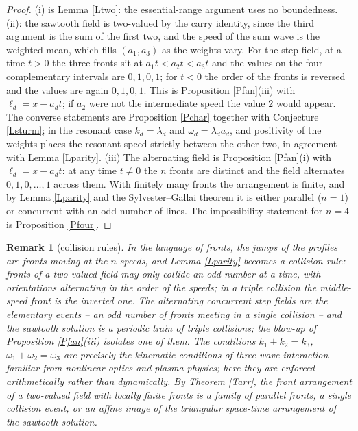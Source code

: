 \documentclass{article}
\newtheorem{remark}{Remark}
\begin{document}
	\begin{proof}
		(i) is Lemma \ref{Ltwo}: the essential-range argument uses no boundedness. (ii): the sawtooth field is two-valued by the carry identity, since the third argument is the sum of the first two, and the speed of the sum wave is the weighted mean, which fills $(a_1,a_3)$ as the weights vary. For the step field, at a time $t>0$ the three fronts sit at $a_1t<a_2t<a_3t$ and the values on the four complementary intervals are $0,1,0,1$; for $t<0$ the order of the fronts is reversed and the values are again $0,1,0,1$. This is Proposition \ref{Pfan}(iii) with $\ell_d=x-a_dt$; if $a_2$ were not the intermediate speed the value $2$ would appear. The converse statements are Proposition \ref{Pchar} together with Conjecture \ref{Lsturm}; in the resonant case $k_d=\lambda_d$ and $\omega_d=\lambda_da_d$, and positivity of the weights places the resonant speed strictly between the other two, in agreement with Lemma \ref{Lparity}. (iii) The alternating field is Proposition \ref{Pfan}(i) with $\ell_d=x-a_dt$: at any time $t\neq0$ the $n$ fronts are distinct and the field alternates $0,1,0,\dots,1$ across them. With finitely many fronts the arrangement is finite, and by Lemma \ref{Lparity} and the Sylvester--Gallai theorem it is either parallel ($n=1$) or concurrent with an odd number of lines. The impossibility statement for $n=4$ is Proposition \ref{Pfour}.
	\end{proof}

	\begin{remark}[collision rules]
		In the language of fronts, the jumps of the profiles are fronts moving at the $n$ speeds, and Lemma \ref{Lparity} becomes a collision rule: fronts of a two-valued field may only collide an odd number at a time, with orientations alternating in the order of the speeds; in a triple collision the middle-speed front is the inverted one. The alternating concurrent step fields are the elementary events -- an odd number of fronts meeting in a single collision -- and the sawtooth solution is a periodic train of triple collisions; the blow-up of Proposition \ref{Pfan}(iii) isolates one of them. The conditions $k_1+k_2=k_3$, $\omega_1+\omega_2=\omega_3$ are precisely the kinematic conditions of three-wave interaction familiar from nonlinear optics and plasma physics; here they are enforced arithmetically rather than dynamically. By Theorem \ref{Tarr}, the front arrangement of a two-valued field with locally finite fronts is a family of parallel fronts, a single collision event, or an affine image of the triangular space-time arrangement of the sawtooth solution.
	\end{remark}
\end{document}
